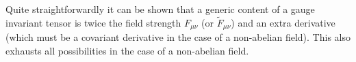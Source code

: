 \documentclass[12pt,preprintnumbers,nofootinbib]{revtex4}
\begin{document}
	Quite straightforwardly it can be shown that a generic content of a gauge
	invariant tensor is twice the field strength  $ F_{\mu\nu} $ (or 
	$ \widetilde{F}_{\mu\nu} $) and an extra derivative 
	(which must be a covariant derivative in the case of a non-abelian field).
	This also exhausts all possibilities in the case of a non-abelian
	field.

\end{document}
